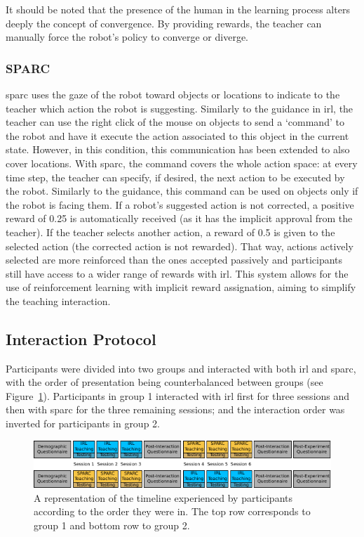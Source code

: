 It should be noted that the presence of the human in the learning process alters deeply the concept of convergence. By providing rewards, the teacher can manually force the robot's policy to converge or diverge.

\subsubsection{SPARC}

\gls{sparc} uses the gaze of the robot toward objects or locations to indicate to the teacher which action the robot is suggesting. Similarly to the guidance in \gls{irl}, the teacher can use the right click of the mouse on objects to send a `command' to the robot and have it execute the action associated to this object in the current state. However, in this condition, this communication has been extended to also cover locations. With \gls{sparc}, the command covers the whole action space: at every time step, the teacher can specify, if desired, the next action to be executed by the robot. Similarly to the guidance, this command can be used on objects only if the robot is facing them. If a robot's suggested action is not corrected, a positive reward of 0.25 is automatically received (as it has the implicit approval from the teacher). If the teacher selects another action, a reward of 0.5 is given to the selected action (the corrected action is not rewarded). That way, actions actively selected are more reinforced than the ones accepted passively and participants still have access to a wider range of rewards with \gls{irl}. This system allows for the use of reinforcement learning with implicit reward assignation, aiming to simplify the teaching interaction.

\subsection{Interaction Protocol}

Participants were divided into two groups and interacted with both \gls{irl} and \gls{sparc}, with the order of presentation being counterbalanced between groups (see Figure~\ref{fig:control_design}). Participants in group 1 interacted with \gls{irl} first for three sessions and then with \gls{sparc} for the three remaining sessions; and the interaction order was inverted for participants in group 2. 

\begin{figure}[ht]
	\centering
	\includegraphics[width=1\textwidth]{protocol.pdf}
	\caption{A representation of the timeline experienced by participants according to the order they were in. The top row corresponds to group 1 and bottom row to group 2.}
	\label{fig:control_design}
\end{figure}

